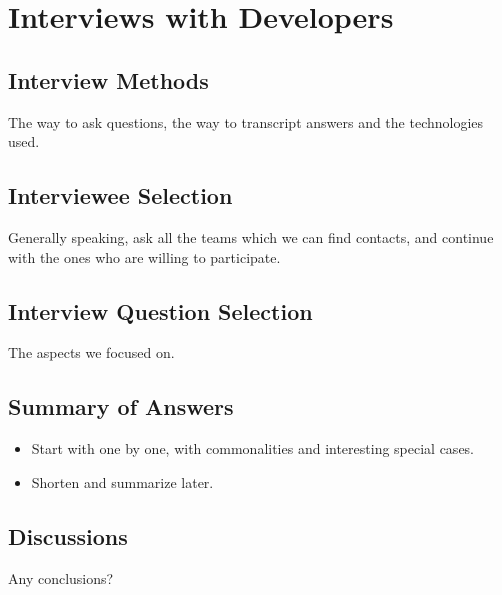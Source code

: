 \chapter{Interviews with Developers}
\label{ch_interviews}

\section{Interview Methods}

The way to ask questions, the way to transcript answers and the technologies used.

\section{Interviewee Selection}

Generally speaking, ask all the teams which we can find contacts, and continue with the ones who are willing to participate.

\section{Interview Question Selection}

The aspects we focused on.

\section{Summary of Answers}

\begin{itemize}
\item Start with one by one, with commonalities and interesting special cases.

\item Shorten and summarize later.
\end{itemize}

\section{Discussions}

Any conclusions?
